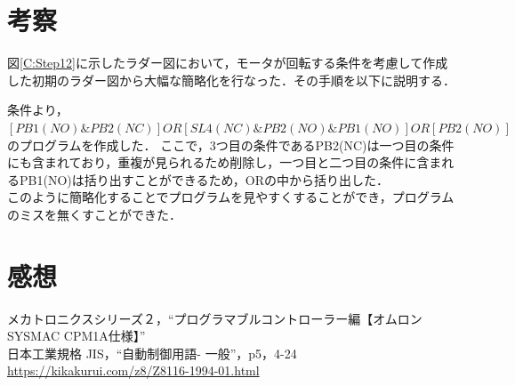 \documentclass[a4paper,11pt]{jsarticle}
\begin{document}
\section{考察}
図\ref{C:Step12}に示したラダー図において，モータが回転する条件を考慮して作成した初期のラダー図から大幅な簡略化を行なった．その手順を以下に説明する．\par
条件より，$\left[PB1(NO) \& PB2(NC)\right] OR \left[SL4(NC) \& PB2(NO) \& PB1(NO)\right] OR \left[PB2(NO)\right]$のプログラムを作成した．
ここで，3つ目の条件であるPB2(NC)は一つ目の条件にも含まれており，重複が見られるため削除し，一つ目と二つ目の条件に含まれるPB1(NO)は括り出すことができるため，ORの中から括り出した．\\
このように簡略化することでプログラムを見やすくすることができ，プログラムのミスを無くすことができた．
\section{感想}

\begin{thebibliography}{99}
   メカトロニクスシリーズ２，``プログラマブルコントローラー編【オムロン SYSMAC CPM1A仕様】'' \\
   日本工業規格 JIS，``自動制御用語- 一般''，p5，4-24 \\ \url{https://kikakurui.com/z8/Z8116-1994-01.html} \\

\end{thebibliography}
\end{document}
